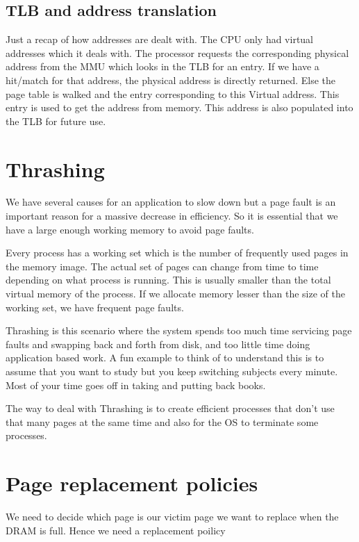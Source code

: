 \documentclass[12pt]{article}
\newcommand{\tbox}[1]{\noindent\fbox{\parbox{\textwidth}{#1}}}
\begin{document}
\subsection*{TLB and address translation}
Just a recap of how addresses are dealt with. The CPU only had virtual addresses which it deals with. The processor
requests the corresponding physical address from the MMU which looks in the TLB for an entry. If we have a hit/match for that address, the 
physical address is directly returned. Else the page table is walked and the entry corresponding to this Virtual address. This entry is used to get the 
address from memory. This address is also populated into the TLB for future use.     
\newpage
\noindent\tbox{
    \begin{center}
    \textbf{\Huge Lecture 17}
    \end{center}
}

\section{Thrashing}
We have several causes for an application to slow down but a page fault is an important reason for a massive decrease in efficiency. 
So it is essential that we have a large enough working memory to avoid page faults. 

Every process has a working set which is the number of frequently used pages in the memory image. The actual set of pages can change from time to time
depending on what process is running. This is usually smaller than the total virtual memory of the process. If we allocate memory lesser than the
size of the working set, we have frequent page faults.

Thrashing is this scenario where the system spends too much time servicing page faults and swapping back and forth from disk, and too little time doing
application based work. A fun example to think of to understand this is to assume that you want to study but you keep switching subjects every minute. Most of your time
goes off in taking and putting back books. 

The way to deal with Thrashing is to create efficient processes that don't use that many pages at the same time and also for the OS to terminate some processes.




\section{Page replacement policies}
We need to decide which page is our victim page we want to replace when the DRAM is full. Hence we need a replacement
poilicy
\end{document}
